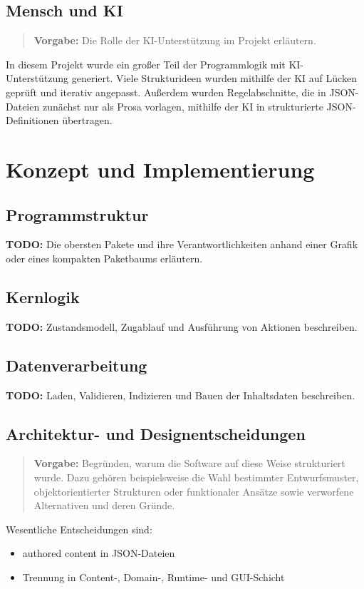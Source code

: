 \documentclass[
  12pt,
  a4paper,
  oneside,
  parskip=half,
  headings=normal
]{scrreprt}
\newcommand{\vorgabe}[1]{%
  \begin{quote}
    \small\color{hinweisfarbe}\textbf{Vorgabe:} #1
  \end{quote}
}
\newcommand{\todo}[1]{%
  \par\noindent\textcolor{red!70!black}{\textbf{TODO:} #1}\par
}
\begin{document}
\section{Mensch und KI}

\vorgabe{Die Rolle der KI-Unterstützung im Projekt erläutern.}

In diesem Projekt wurde ein großer Teil der Programmlogik mit
KI-Unterstützung generiert. Viele Strukturideen wurden mithilfe der KI auf
Lücken geprüft und iterativ angepasst. Außerdem wurden Regelabschnitte, die in
JSON-Dateien zunächst nur als Prosa vorlagen, mithilfe der KI in strukturierte
JSON-Definitionen übertragen.

\chapter{Konzept und Implementierung}

\section{Programmstruktur}
\todo{Die obersten Pakete und ihre Verantwortlichkeiten anhand einer Grafik
oder eines kompakten Paketbaums erläutern.}

\section{Kernlogik}
\todo{Zustandsmodell, Zugablauf und Ausführung von Aktionen beschreiben.}

\section{Datenverarbeitung}
\todo{Laden, Validieren, Indizieren und Bauen der Inhaltsdaten beschreiben.}

\section{Architektur- und Designentscheidungen}

\vorgabe{Begründen, warum die Software auf diese Weise strukturiert wurde.
Dazu gehören beispielsweise die Wahl bestimmter Entwurfsmuster,
objektorientierter Strukturen oder funktionaler Ansätze sowie verworfene
Alternativen und deren Gründe.}

Wesentliche Entscheidungen sind:
\begin{itemize}
  \item authored content in JSON-Dateien
  \item Trennung in Content-, Domain-, Runtime- und GUI-Schicht
\end{itemize}
\end{document}
